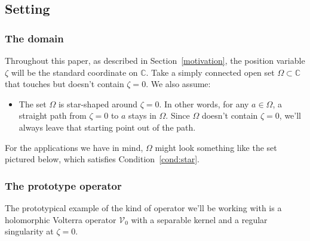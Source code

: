 \documentclass{article}
\makeatletter
\theoremstyle{plain}
\newcommand{\cond}[1]{\item[(\textsc{#1})]\protected@edef\@currentlabel{\textsc{#1}}}
\newcommand{\C}{\mathbb{C}}
\newcommand{\hardpart}{\mathcal{V}_0}
\newcommand{\domain}{\Omega}
\makeatother
\begin{document}
\subsection{Setting}\label{setting}
\subsubsection{The domain}\label{setting:domain}
Throughout this paper, as described in Section~\ref{motivation}, the position variable $\zeta$ will be the standard coordinate on $\C$. Take a simply connected open set $\domain \subset \C$ that touches but doesn't contain $\zeta = 0$. We also assume:
\begin{itemize}
\cond{star}\label{cond:star} The set $\domain$ is star-shaped around $\zeta = 0$. In other words, for any $a \in \domain$, a straight path from $\zeta = 0$ to $a$ stays in $\domain$. Since $\domain$ doesn't contain $\zeta = 0$, we'll always leave that starting point out of the path.
\end{itemize}
For the applications we have in mind, $\domain$ might look something like the set pictured below, which satisfies Condition~\eqref{cond:star}.
\begin{center}
\end{center}
\subsubsection{The prototype operator}\label{setting:basic}
The prototypical example of the kind of operator we'll be working with is a holomorphic Volterra operator $\hardpart$ with a separable kernel and a regular singularity at $\zeta = 0$.
\end{document}
